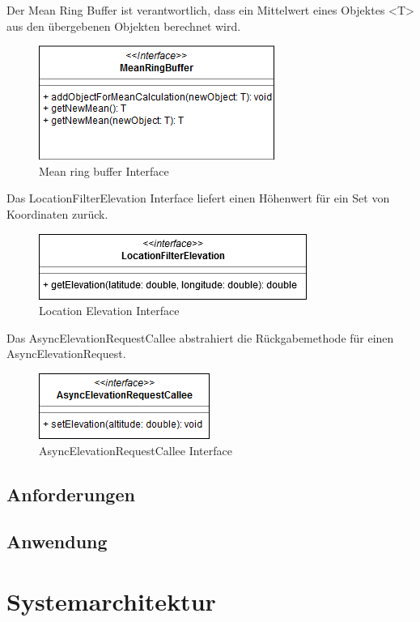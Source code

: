 \documentclass[a4paper]{scrreprt}
\begin{document}
Der Mean Ring Buffer ist verantwortlich, dass ein Mittelwert eines Objektes <T> aus den übergebenen Objekten berechnet wird.
\begin{figure}
	\center
	\includegraphics[scale=0.6]{MeanRingBuffer.png}
	\caption{Mean ring buffer Interface}
\end{figure}

Das LocationFilterElevation Interface liefert einen Höhenwert für ein Set von Koordinaten zurück.
\begin{figure}
	\center
	\includegraphics[scale=0.6]{LocationFilterElevation.png}
	\caption{Location Elevation Interface}
\end{figure}

Das AsyncElevationRequestCallee abstrahiert die Rückgabemethode für einen AsyncElevationRequest.
\begin{figure}
	\center
	\includegraphics[scale=0.6]{AsyncElevationRequestCallee.png}
	\caption{AsyncElevationRequestCallee Interface}
\end{figure}

\subsection{Anforderungen}

\subsection{Anwendung}

\section{Systemarchitektur}
\end{document}
